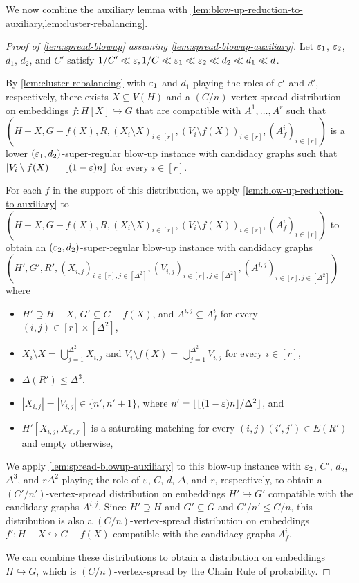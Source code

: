 \documentclass[11pt]{amsart}
\begin{document}
We now combine the auxiliary lemma with
\cref{lem:blow-up-reduction-to-auxiliary,lem:cluster-rebalancing}.
\begin{proof}[Proof of \cref{lem:spread-blowup} assuming \cref{lem:spread-blowup-auxiliary}]
    Let $\varepsilon_1$, $\varepsilon_2$, $d_1$, $d_2$, and $C'$ satisfy $1 / C' \ll \varepsilon, 1/C \ll \varepsilon_1 \ll \varepsilon_2 \ll d_2 \ll d_1 \ll d$.

    By \cref{lem:cluster-rebalancing} with $\varepsilon_1$ and $d_1$ playing the roles of $\varepsilon'$ and $d'$, respectively, there exists $X \subseteq V(H)$ and a $(C / n)$-vertex-spread distribution on embeddings $f : H[X] \hookrightarrow G$ that are compatible with $A^1, \dots, A^r$ such that $(H - X, G - f(X), R, (X_i\setminus X)_{i\in [r]},\allowbreak (V_i\setminus f(X))_{i\in [r]},(A_f^i)_{i \in [r]})$ is a lower $(\varepsilon_1, d_2)$-super-regular blow-up instance with candidacy graphs such that $|V_i \setminus f(X)| = \lfloor (1 - \varepsilon) n\rfloor$ for every $i \in [r]$. 

    For each $f$ in the support of this distribution, we apply \cref{lem:blow-up-reduction-to-auxiliary} to $(H - X, G - f(X), R, (X_i\setminus X)_{i\in [r]},\allowbreak (V_i\setminus f(X))_{i\in [r]},(A_f^i)_{i \in [r]})$ to obtain an $(\varepsilon_2, d_2)$-super-regular blow-up instance with candidacy graphs $(H', G', R', (X_{i,j})_{i\in [r],j\in[\Delta^2]}, (V_{i,j})_{i\in [r],j\in[\Delta^2]}, (A^{i,j})_{i \in [r],j\in[\Delta^2]})$ where 
\begin{itemize}
    \item $H' \supseteq H - X$, $G' \subseteq G - f(X)$,  and $A^{i,j} \subseteq A^i_f$ for every $(i,j) \in [r]\times[\Delta^2]$,
    \item $X_i \setminus X = \bigcup_{j=1}^{\Delta^2} X_{i,j}$ and $V_i \setminus f(X) = \bigcup_{j=1}^{\Delta^2} V_{i,j}$ for every $i \in [r]$,
    \item $\Delta(R') \leq \Delta^3$, 
    \item $|X_{i,j}| = |V_{i,j}| \in \{n', n'+1\}$, where $n' = \lfloor \lfloor (1 - \varepsilon)n\rfloor / \Delta^2\rfloor$, and
    \item $H'[X_{i,j}, X_{i',j'}]$ is a saturating matching for every $(i,j)(i',j') \in E(R')$ and empty otherwise,
\end{itemize}
  
    We apply \cref{lem:spread-blowup-auxiliary} to this blow-up instance with $\varepsilon_2$, $C'$, $d_2$, $\Delta^3$, and $r\Delta^2$ playing the role of $\varepsilon$, $C$, $d$, $\Delta$, and $r$, respectively, to obtain a $(C' / n')$-vertex-spread distribution on embeddings $H' \hookrightarrow G'$ compatible with the candidacy graphs $A^{i,j}$.  Since $H' \supseteq H$ and $G' \subseteq G$ and $C' / n' \leq C / n$, this distribution is also a $(C / n)$-vertex-spread distribution on embeddings $f' : H - X \hookrightarrow G - f(X)$ compatible with the candidacy graphs $A^i_f$. 
    
    We can combine these distributions to obtain a distribution on embeddings $H \hookrightarrow G$, which is $(C / n)$-vertex-spread by the Chain Rule of probability.
\end{proof}
\end{document}
